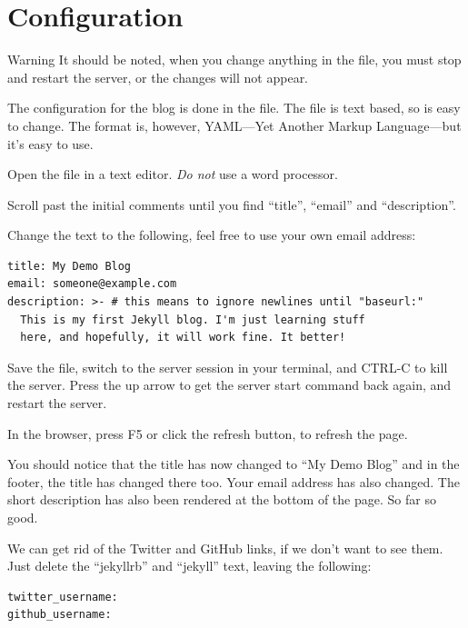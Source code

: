 \section{Configuration}\label{sect: Configuration}

\begin{tips}{Warning}
    It should be noted, when you change anything in the  file, you must stop and restart the server, or the changes will not appear.
\end{tips}

The configuration for the blog is done in the  file. The file is text based, so is easy to change. The format is, however, YAML---Yet Another Markup Language---but it's easy to use.

Open the file in a text editor. \emph{Do not} use a word processor.

Scroll past the initial comments until you find ``title'', ``email'' and ``description''.

Change the text to the following, feel free to use your own email address:

\begin{lstlisting}[caption={Configuring my blog.},style=myText]
title: My Demo Blog
email: someone@example.com
description: >- # this means to ignore newlines until "baseurl:"
  This is my first Jekyll blog. I'm just learning stuff
  here, and hopefully, it will work fine. It better!
\end{lstlisting}

Save the file, switch to the server session in your terminal, and CTRL-C to kill the server. Press the up arrow to get the server start command back again, and restart the server.

In the browser, press F5 or click the refresh button, to refresh the page.

You should notice that the title has now changed to ``My Demo Blog'' and in the footer, the title has changed there too. Your email address has also changed. The short description has also been rendered at the bottom of the page. So far so good.

We can get rid of the Twitter and GitHub links, if we don't want to see them. Just delete the ``jekyllrb'' and ``jekyll'' text, leaving the following:

\begin{lstlisting}[caption={Configuring Twitter and GitHub links.},style=myText]
twitter_username:
github_username:
\end{lstlisting}


